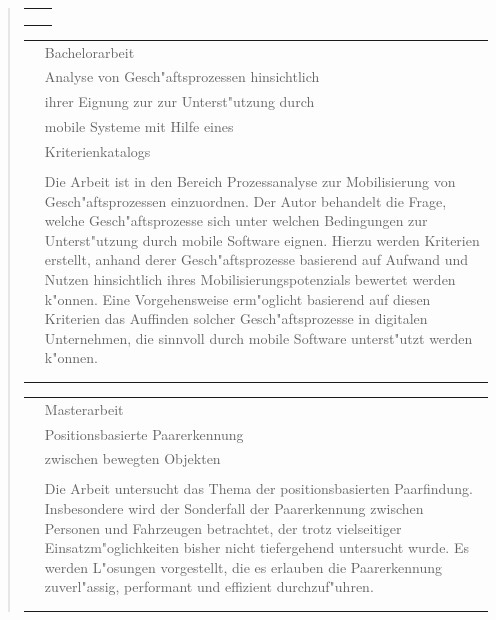 \begin{quote}
\begin{tabular}{p{4cm}l}
\begin{minipage}{10cm}
		\end{minipage}\\\\\\
	\end{tabular}
%
	\begin{tabular}{p{4cm}l}
		&Bachelorarbeit\\
		&\qquad Analyse von Gesch"aftsprozessen hinsichtlich\\
		&\qquad ihrer Eignung zur zur Unterst"utzung durch\\
		&\qquad mobile Systeme mit Hilfe eines\\
		&\qquad Kriterienkatalogs\\\\
		&\begin{minipage}{10cm}
		Die Arbeit ist in den Bereich Prozessanalyse zur Mobilisierung von Gesch"aftsprozessen einzuordnen. Der Autor behandelt die Frage, welche Gesch"aftsprozesse sich unter welchen Bedingungen zur Unterst"utzung durch mobile Software eignen. Hierzu werden Kriterien erstellt, anhand derer Gesch"aftsprozesse basierend auf Aufwand und Nutzen hinsichtlich ihres Mobilisierungspotenzials bewertet werden k"onnen. Eine Vorgehensweise erm"oglicht basierend auf diesen Kriterien das Auffinden solcher Gesch"aftsprozesse in digitalen Unternehmen, die sinnvoll durch mobile Software unterst"utzt werden k"onnen.
		\end{minipage}\\\\\\
	\end{tabular}
%
	\begin{tabular}{p{4cm}l}
		&Masterarbeit\\
		&\qquad Positionsbasierte Paarerkennung\\
		&\qquad zwischen bewegten Objekten\\\\
		&\begin{minipage}{10cm}
		Die Arbeit untersucht das Thema der positionsbasierten Paarfindung. Insbesondere wird der Sonderfall der Paarerkennung zwischen Personen und Fahrzeugen betrachtet, der trotz vielseitiger Einsatzm"oglichkeiten bisher nicht tiefergehend untersucht wurde. Es werden L"osungen vorgestellt, die es erlauben die Paarerkennung zuverl"assig, performant und effizient durchzuf"uhren.
		\end{minipage}\\\\\\

\end{tabular}
\end{quote}
